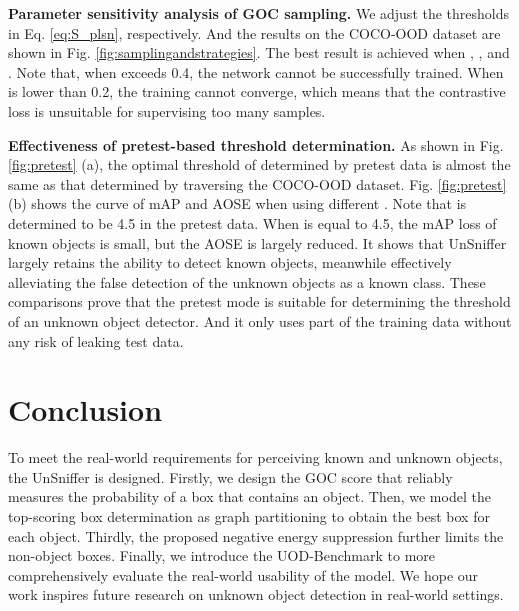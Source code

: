 \documentclass[10pt,twocolumn,letterpaper]{article}
\newcommand{\net}{UnSniffer\xspace}
\begin{document}
\noindent\textbf{Parameter sensitivity analysis of GOC sampling.}
We adjust the thresholds  in Eq. \ref{eq:S_plsn}, respectively.
And the results on the COCO-OOD dataset are shown in Fig. \ref{fig:samplingandstrategies}.
The best result is achieved when , , and .
Note that, when  exceeds 0.4,
the network cannot be successfully trained.
When  is lower than 0.2,
the training cannot converge,
which means that the contrastive loss  is unsuitable for supervising too many samples.



\noindent\textbf{Effectiveness of pretest-based threshold determination.}
As shown in Fig. \ref{fig:pretest} (a),
the optimal threshold of  determined by pretest data is almost the same as that determined by traversing the COCO-OOD dataset.
Fig. \ref{fig:pretest} (b) shows the curve of mAP and AOSE when using different .
Note that  is determined to be 4.5 in the pretest data.
When  is equal to 4.5,
the mAP loss of known objects is small,
but the AOSE is largely reduced.
It shows that UnSniffer largely retains the ability to detect known objects,
meanwhile effectively alleviating the false detection of the unknown objects as a known class.
These comparisons prove that the pretest mode is suitable for determining the threshold of an unknown object detector.
And it only uses part of the training data without any risk of leaking test data.



\section{Conclusion}
\label{sec:conclusion}
To meet the real-world requirements for perceiving known and unknown objects,
the \net is designed.
Firstly,
we design the GOC score that reliably measures the probability of a box that contains an object.
Then, we model the top-scoring box determination as graph partitioning to obtain the best box for each object.
Thirdly,
the proposed negative energy suppression further limits the non-object boxes.
Finally, we introduce the UOD-Benchmark to more comprehensively evaluate the real-world usability of the model.
We hope our work inspires future research on unknown object detection in real-world settings.

{\small


}
\end{document}

